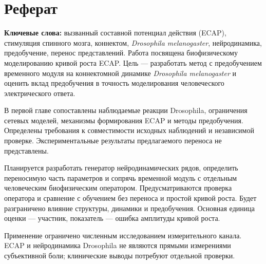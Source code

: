 \chapter*{Реферат}
{\centering\bfseries\WorkingTitle\par}
\medskip
{\centering\AuthorName\par}
\medskip
\noindent\textbf{Ключевые слова:} вызванный составной потенциал действия (ECAP), стимуляция спинного мозга, коннектом, \textit{Drosophila melanogaster}, нейродинамика, предобучение, перенос представлений.
\medskip
Работа посвящена биофизическому моделированию кривой роста ECAP. Цель --- разработать метод с предобучением временного модуля на коннектомной динамике \textit{Drosophila melanogaster} и оценить вклад предобучения в точность моделирования человеческого электрического ответа.

В первой главе сопоставлены наблюдаемые реакции Drosophila, ограничения сетевых моделей, механизмы формирования ECAP и методы предобучения. Определены требования к совместимости исходных наблюдений и независимой проверке. Экспериментальные результаты предлагаемого переноса не представлены.

Планируется разработать генератор нейродинамических рядов, определить переносимую часть параметров и сопрячь временной модуль с отдельным человеческим биофизическим оператором. Предусматриваются проверка оператора и сравнение с обучением без переноса и простой кривой роста. Будет разграничено влияние структуры, динамики и предобучения. Основная единица оценки --- участник, показатель --- ошибка амплитуды кривой роста.

Применение ограничено численным исследованием измерительного канала. ECAP и нейродинамика Drosophila не являются прямыми измерениями субъективной боли; клинические выводы потребуют отдельной проверки.
